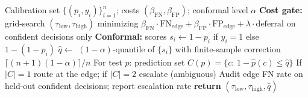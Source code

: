 \begin{algorithm}[!t]
\caption{Cost-calibrated dual-threshold gate and split-conformal audit}
\label{alg:gate}
\begin{algorithmic}[1]
\REQUIRE Calibration set $\{(p_i,y_i)\}_{i=1}^{n}$; costs $(\beta_{\mathrm{FN}},\beta_{\mathrm{FP}})$; conformal level $\alpha$
\STATE \textbf{Cost gate:} grid-search $(\tau_{\mathrm{low}},\tau_{\mathrm{high}})$ minimizing $\beta_{\mathrm{FN}}\!\cdot\!\mathrm{FN}_{\mathrm{edge}}+\beta_{\mathrm{FP}}\!\cdot\!\mathrm{FP}_{\mathrm{edge}}+\lambda\cdot\mathrm{deferral}$ on confident decisions only
\STATE \textbf{Conformal:} scores $s_i\leftarrow 1-p_i$ if $y_i{=}1$ else $1-(1-p_i)$
\STATE $\hat{q}\leftarrow$ $(1-\alpha)$-quantile of $\{s_i\}$ with finite-sample correction $\lceil(n{+}1)(1{-}\alpha)\rceil/n$
\STATE For test $p$: prediction set $C(p)=\{c:\,1{-}\hat{p}(c)\le\hat{q}\}$
\STATE If $|C|{=}1$ route at the edge; if $|C|{=}2$ escalate (ambiguous)
\STATE Audit edge FN rate on held-out confident decisions; report escalation rate
\STATE \textbf{return} $(\tau_{\mathrm{low}},\tau_{\mathrm{high}},\hat{q})$
\end{algorithmic}
\end{algorithm}
